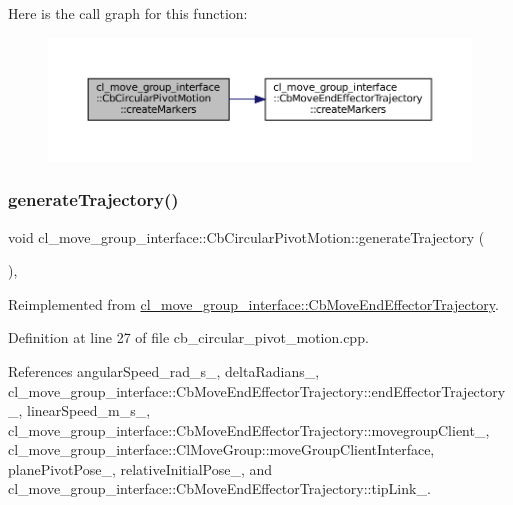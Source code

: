 Here is the call graph for this function\+:
\nopagebreak
\begin{figure}[H]
\begin{center}
\leavevmode
\includegraphics[width=350pt]{classcl__move__group__interface_1_1CbCircularPivotMotion_a48911ad62608cb00c04e979e2f6f644a_cgraph}
\end{center}
\end{figure}
\mbox{\label{classcl__move__group__interface_1_1CbCircularPivotMotion_a8d019ec6b9b26a2af0740b915d441a40}} 
\subsubsection{\texorpdfstring{generate\+Trajectory()}{generateTrajectory()}}
{\footnotesize\ttfamily void cl\+\_\+move\+\_\+group\+\_\+interface\+::\+Cb\+Circular\+Pivot\+Motion\+::generate\+Trajectory (\begin{DoxyParamCaption}{ }\end{DoxyParamCaption})\hspace{0.3cm}{\ttfamily [override]}, {\ttfamily [virtual]}}



Reimplemented from \hyperlink{classcl__move__group__interface_1_1CbMoveEndEffectorTrajectory_aeae938ab66e18ab7d2fb2427bc83647b}{cl\+\_\+move\+\_\+group\+\_\+interface\+::\+Cb\+Move\+End\+Effector\+Trajectory}.



Definition at line 27 of file cb\+\_\+circular\+\_\+pivot\+\_\+motion.\+cpp.



References angular\+Speed\+\_\+rad\+\_\+s\+\_\+, delta\+Radians\+\_\+, cl\+\_\+move\+\_\+group\+\_\+interface\+::\+Cb\+Move\+End\+Effector\+Trajectory\+::end\+Effector\+Trajectory\+\_\+, linear\+Speed\+\_\+m\+\_\+s\+\_\+, cl\+\_\+move\+\_\+group\+\_\+interface\+::\+Cb\+Move\+End\+Effector\+Trajectory\+::movegroup\+Client\+\_\+, cl\+\_\+move\+\_\+group\+\_\+interface\+::\+Cl\+Move\+Group\+::move\+Group\+Client\+Interface, plane\+Pivot\+Pose\+\_\+, relative\+Initial\+Pose\+\_\+, and cl\+\_\+move\+\_\+group\+\_\+interface\+::\+Cb\+Move\+End\+Effector\+Trajectory\+::tip\+Link\+\_\+.


